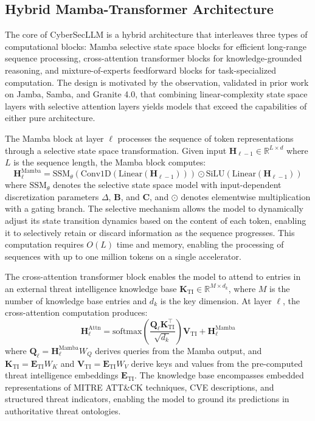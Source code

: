 \documentclass[journal]{IEEEtran}
\newcommand{\modelname}{CyberSecLLM}
\newcommand{\RR}{\mathbb{R}}
\begin{document}
\subsection{Hybrid Mamba-Transformer Architecture}
\label{subsec:architecture}

The core of \modelname{} is a hybrid architecture that interleaves three types of computational blocks: Mamba selective state space blocks for efficient long-range sequence processing, cross-attention transformer blocks for knowledge-grounded reasoning, and mixture-of-experts feedforward blocks for task-specialized computation. The design is motivated by the observation, validated in prior work on Jamba, Samba, and Granite 4.0, that combining linear-complexity state space layers with selective attention layers yields models that exceed the capabilities of either pure architecture.

The Mamba block at layer $\ell$ processes the sequence of token representations through a selective state space transformation. Given input $\mathbf{H}_{\ell-1} \in \RR^{L \times d}$ where $L$ is the sequence length, the Mamba block computes:
\begin{equation}
\mathbf{H}_{\ell}^{\text{Mamba}} = \text{SSM}_{\theta}(\text{Conv1D}(\text{Linear}(\mathbf{H}_{\ell-1}))) \odot \text{SiLU}(\text{Linear}(\mathbf{H}_{\ell-1}))
\label{eq:mamba_block}
\end{equation}
where $\text{SSM}_{\theta}$ denotes the selective state space model with input-dependent discretization parameters $\Delta$, $\mathbf{B}$, and $\mathbf{C}$, and $\odot$ denotes elementwise multiplication with a gating branch. The selective mechanism allows the model to dynamically adjust its state transition dynamics based on the content of each token, enabling it to selectively retain or discard information as the sequence progresses. This computation requires $O(L)$ time and memory, enabling the processing of sequences with up to one million tokens on a single accelerator.

The cross-attention transformer block enables the model to attend to entries in an external threat intelligence knowledge base $\mathbf{K}_{\text{TI}} \in \RR^{M \times d_k}$, where $M$ is the number of knowledge base entries and $d_k$ is the key dimension. At layer $\ell$, the cross-attention computation produces:
\begin{equation}
\mathbf{H}_{\ell}^{\text{Attn}} = \text{softmax}\!\left(\frac{\mathbf{Q}_{\ell} \mathbf{K}_{\text{TI}}^{\top}}{\sqrt{d_k}}\right) \mathbf{V}_{\text{TI}} + \mathbf{H}_{\ell}^{\text{Mamba}}
\label{eq:cross_attn}
\end{equation}
where $\mathbf{Q}_{\ell} = \mathbf{H}_{\ell}^{\text{Mamba}} W_Q$ derives queries from the Mamba output, and $\mathbf{K}_{\text{TI}} = \mathbf{E}_{\text{TI}} W_K$ and $\mathbf{V}_{\text{TI}} = \mathbf{E}_{\text{TI}} W_V$ derive keys and values from the pre-computed threat intelligence embeddings $\mathbf{E}_{\text{TI}}$. The knowledge base encompasses embedded representations of MITRE ATT\&CK techniques, CVE descriptions, and structured threat indicators, enabling the model to ground its predictions in authoritative threat ontologies.
\end{document}
